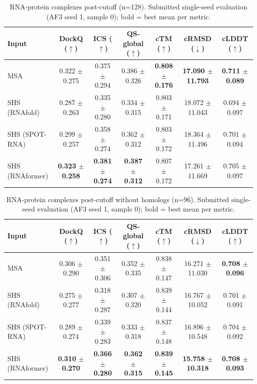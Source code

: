 \begin{table}[htbp]
\centering
\caption{RNA-protein complexes post-cutoff (n=128). Submitted single-seed evaluation (AF3 seed 1, sample 0); bold = best mean per metric.}
\label{tab:rna_protein_complexes_post_cutoff}
\begin{tabular}{lcccccc}
\toprule
Input & DockQ ($\uparrow$) & ICS ($\uparrow$) & QS-global ($\uparrow$) & cTM ($\uparrow$) & cRMSD ($\downarrow$) & cLDDT ($\uparrow$) \\
\midrule
MSA & 0.322 $\pm$ 0.275 & 0.375 $\pm$ 0.294 & 0.386 $\pm$ 0.326 & \textbf{0.808 $\pm$ 0.176} & \textbf{17.090 $\pm$ 11.793} & \textbf{0.711 $\pm$ 0.089} \\
SHS (RNAfold) & 0.287 $\pm$ 0.263 & 0.335 $\pm$ 0.280 & 0.334 $\pm$ 0.315 & 0.803 $\pm$ 0.171 & 18.072 $\pm$ 11.043 & 0.694 $\pm$ 0.097 \\
SHS (SPOT-RNA) & 0.299 $\pm$ 0.257 & 0.358 $\pm$ 0.274 & 0.362 $\pm$ 0.312 & 0.803 $\pm$ 0.172 & 18.364 $\pm$ 11.496 & 0.701 $\pm$ 0.094 \\
SHS (RNAformer) & \textbf{0.323 $\pm$ 0.258} & \textbf{0.381 $\pm$ 0.274} & \textbf{0.387 $\pm$ 0.312} & 0.807 $\pm$ 0.172 & 17.261 $\pm$ 11.669 & 0.705 $\pm$ 0.097 \\
\bottomrule
\end{tabular}
\end{table}

\begin{table}[htbp]
\centering
\caption{RNA-protein complexes post-cutoff without homologs (n=96). Submitted single-seed evaluation (AF3 seed 1, sample 0); bold = best mean per metric.}
\label{tab:rna_protein_complexes_post_cutoff_without_homologs}
\begin{tabular}{lcccccc}
\toprule
Input & DockQ ($\uparrow$) & ICS ($\uparrow$) & QS-global ($\uparrow$) & cTM ($\uparrow$) & cRMSD ($\downarrow$) & cLDDT ($\uparrow$) \\
\midrule
MSA & 0.306 $\pm$ 0.290 & 0.351 $\pm$ 0.306 & 0.352 $\pm$ 0.335 & 0.838 $\pm$ 0.147 & 16.271 $\pm$ 11.030 & \textbf{0.708 $\pm$ 0.096} \\
SHS (RNAfold) & 0.275 $\pm$ 0.277 & 0.318 $\pm$ 0.287 & 0.307 $\pm$ 0.320 & 0.839 $\pm$ 0.144 & 16.767 $\pm$ 10.052 & 0.701 $\pm$ 0.091 \\
SHS (SPOT-RNA) & 0.289 $\pm$ 0.274 & 0.339 $\pm$ 0.283 & 0.333 $\pm$ 0.318 & 0.837 $\pm$ 0.148 & 16.896 $\pm$ 10.548 & 0.704 $\pm$ 0.092 \\
SHS (RNAformer) & \textbf{0.310 $\pm$ 0.270} & \textbf{0.366 $\pm$ 0.280} & \textbf{0.362 $\pm$ 0.315} & \textbf{0.839 $\pm$ 0.145} & \textbf{15.758 $\pm$ 10.318} & \textbf{0.708 $\pm$ 0.093} \\
\bottomrule
\end{tabular}
\end{table}

